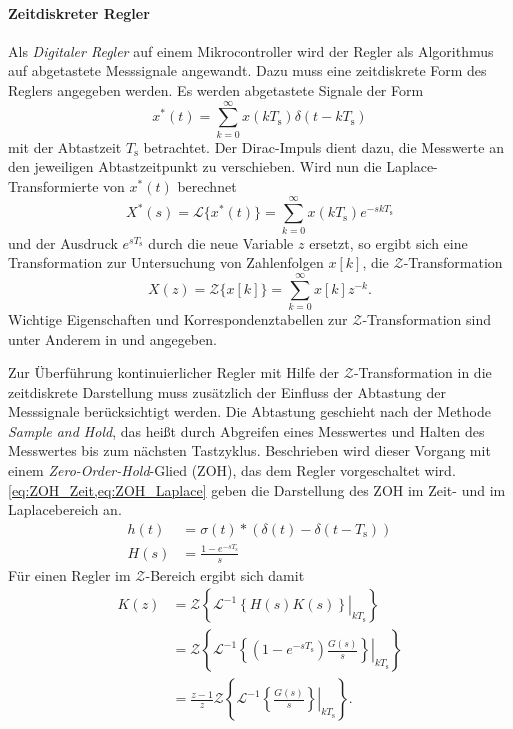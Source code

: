 \paragraph{Zeitdiskreter Regler}\label{par:ZeitdiskreterRegler}
Als \emph{Digitaler Regler} auf einem Mikrocontroller wird der Regler als Algorithmus auf abgetastete Messsignale angewandt. Dazu muss eine zeitdiskrete Form des Reglers angegeben werden. Es werden abgetastete Signale der Form \begin{equation}
    x^*(t) = \sum_{k=0}^\infty x(kT_{\mathrm{s}})\delta(t-kT_{\mathrm{s}})
\end{equation} mit der Abtastzeit $T_{\mathrm{s}}$ betrachtet. Der Dirac-Impuls dient dazu, die Messwerte an den jeweiligen Abtastzeitpunkt zu verschieben. Wird nun die Laplace-Transformierte von $x^*(t)$ berechnet 
\begin{equation}
    X^*(s) = \mathcal{L}\{x^*(t)\} = \sum_{k=0}^\infty x(kT_{\mathrm{s}})e^{-skT_{\mathrm{s}}} 
\end{equation}
und der Ausdruck $e^{sT_{\mathrm{s}}}$ durch die neue Variable $z$ ersetzt, so ergibt sich eine Transformation zur Untersuchung von Zahlenfolgen $x[k]$, die $\mathcal{Z}$-Transformation
\begin{equation}
    X(z) = \mathcal{Z}\{x[k]\} = \sum_{k=0}^\infty x[k]z^{-k}.
\end{equation} Wichtige Eigenschaften und Korrespondenztabellen zur $\mathcal{Z}$-Transformation sind unter Anderem in \cite{mbihiTableZtransforms2018} und \cite[S.~112-114]{unbehauenRegelungstechnikZustandsregelungenDigitale2009} angegeben.

Zur Überführung kontinuierlicher Regler mit Hilfe der $\mathcal{Z}$-Transformation in die zeitdiskrete Darstellung muss zusätzlich der Einfluss der Abtastung der Messsignale berücksichtigt werden. Die Abtastung geschieht nach der Methode \emph{Sample and Hold}, das heißt durch Abgreifen eines Messwertes und Halten des Messwertes bis zum nächsten Tastzyklus. Beschrieben wird dieser Vorgang mit einem \emph{Zero-Order-Hold}-Glied (ZOH), das dem Regler vorgeschaltet wird. \cref{eq:ZOH_Zeit,eq:ZOH_Laplace} geben die Darstellung des ZOH im Zeit- und im Laplacebereich an.
\begin{align}
    h(t) &= \sigma(t)*\left(\delta(t) - \delta(t-T_{\mathrm{s}})\right) \label{eq:ZOH_Zeit}\\
    H(s) &= \frac{1 - e^{-sT_{\mathrm{s}}}}{s} \label{eq:ZOH_Laplace}
\end{align}
Für einen Regler im $\mathcal{Z}$-Bereich ergibt sich damit
\begin{equation}
\begin{split}\label{eq:ReglerZBereich}
    K(z) &= \mathcal{Z}\left\{ \left.\mathcal{L}^{-1}\left\{ H(s)K(s) \right\}\right|_{kT_{\mathrm{s}}} \right\} \\
    &= \mathcal{Z}\left\{ \left.\mathcal{L}^{-1}\left\{ (1 - e^{-sT_{\mathrm{s}}})\frac{G(s)}{s} \right\}\right|_{kT_{\mathrm{s}}} \right\} \\
    &= \frac{z-1}{z} \mathcal{Z}\left\{ \mathcal{L}^{-1}\left.\left\{\frac{G(s)}{s}\right\}\right|_{kT_{\mathrm{s}}} \right\}. 
\end{split}
\end{equation}

